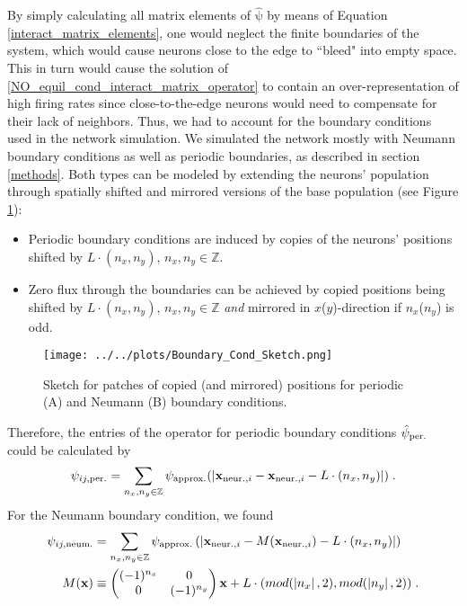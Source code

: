 \documentclass[10pt,a4paper]{article}
\begin{document}
By simply calculating all matrix elements of $\mathrm{\hat{\psi}}$ by means of Equation \eqref{interact_matrix_elements}, one would neglect the finite boundaries of the system, which would cause neurons close to the edge to ``bleed" into empty space. This in turn would cause the solution of \eqref{NO_equil_cond_interact_matrix_operator} to contain an over-representation of high firing rates since close-to-the-edge neurons would need to compensate for their lack of neighbors. Thus, we had to account for the boundary conditions used in the network simulation. We simulated the network mostly with Neumann boundary conditions as well as periodic boundaries, as described in section \ref{methods}. Both types can be modeled by extending the neurons' population through spatially shifted and mirrored versions of the base population (see Figure \ref{Bound_Cond_Patches}):
\begin{itemize}
\item Periodic boundary conditions are induced by copies of the neurons' positions shifted by $L\cdot (n_x,n_y)$, $n_x,n_y \in \mathbb{Z}$.
\item Zero flux through the boundaries can be achieved by copied positions being shifted by $L\cdot (n_x,n_y)$, $n_x,n_y \in \mathbb{Z}$ \textit{and} mirrored in $x$($y$)-direction if $n_x$($n_y$) is odd.
\end{itemize}
\begin{figure}
\begin{center}
\texttt{[image: ../../plots/Boundary\_Cond\_Sketch.png]}
\end{center}
\caption{Sketch for patches of copied (and mirrored) positions for periodic (A) and Neumann (B) boundary conditions.}
\label{Bound_Cond_Patches}
\end{figure}
Therefore, the entries of the operator for periodic boundary conditions $\hat{\psi}_{\rm per.}$ could be calculated by
\begin{equation}
\psi_{ij,\rm per.} = \sum_{n_x,n_y \in \mathbb{Z}} \psi_{\rm approx.} (|\mathbf{x}_{\mathrm{ neur.},i}-\mathbf{x}_{\mathrm{ neur.},i} - L \cdot (n_x,n_y)|) \; .
\label{Psi_entries_periodic_bound}
\end{equation}
For the Neumann boundary condition, we found
\begin{align}
\psi_{ij,\rm neum.} &= \sum_{n_x,n_y \in \mathbb{Z}} \psi_{\rm approx.} \left(|\mathbf{x}_{\mathrm{ neur.},i}-M(\mathbf{x}_{\mathrm{neur.},i}) - L \cdot (n_x,n_y)| \right) \label{Psi_entries_neumann_bound} \\
M(\mathbf{x}) &\equiv  
 \begin{pmatrix}
  (-1)^{n_x} & 0\\
  0 & (-1)^{n_y}
 \end{pmatrix}
\mathbf{x} + L \cdot (mod(\left| n_x\right|,2),mod(\left| n_y\right|,2)) \; . \label{Mirror_Operator}
\end{align}
\end{document}
